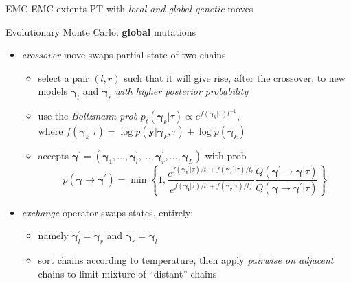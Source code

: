 \documentclass{beamer}
\newcommand{\vect}[1]{\boldsymbol{#1}}
\begin{document}
\begin{frame}{EMC}
EMC extents PT with \emph{local and global genetic} moves
\begin{block}{Evolutionary Monte Carlo: \textbf{global} mutations}
    \begin{itemize}
        \item \emph{crossover} move swaps partial state of two chains
            \begin{itemize}
                \item select a pair $(l, r)$ such that it will give rise, after
                the crossover, to new models $\vect{\gamma}_{l}^{\prime}$
                and $\vect{\gamma}_{r}^{\prime}$ \emph{with higher posterior probability}
                \item use the \emph{Boltzmann prob} $p_{t}(\vect{\gamma}_{k}|\tau) \propto e^{f(\vect{\gamma}_{k}|\tau)t^{-1}}$,\\
                where $f(\vect{\gamma}_{k}|\tau)=\log{p(\vect{y}|\vect{\gamma}_{k},\tau)}+\log{p(\vect{\gamma}_{k})}$
                \item accepts $\vect{\gamma}^{\prime}=(\vect{\gamma}_{1},\ldots,
                \vect{\gamma}_{l}^{\prime},\ldots, \vect{\gamma}_{r}^{\prime},\ldots,
                \vect{\gamma}_{L})$ with prob
                \begin{displaymath}
                    p(\vect{\gamma}\rightarrow\vect{\gamma}^{\prime}) = \min{ \left\lbrace 1,
                    \frac{e^{f(\vect{\gamma_{l}}^{\prime}|\tau)/t_{l}+f(\vect{\gamma_{r}}^{\prime}|\tau)/t_{r}}}
                         {e^{f(\vect{\gamma_{l}}|\tau)/t_{l}+f(\vect{\gamma_{r}}|\tau)/t_{r}}}
                    \frac{Q(\vect{\gamma}^{\prime}\rightarrow\vect{\gamma}|\tau)}
                         {Q(\vect{\gamma}\rightarrow\vect{\gamma}^{\prime}|\tau)}
                    \right\rbrace}
                \end{displaymath}
            \end{itemize}
        \item \emph{exchange} operator swaps states, entirely: 
            \begin{itemize}
                \item namely $\vect{\gamma}_{l}^{\prime} = \vect{\gamma}_{r}$
                and $\vect{\gamma}_{r}^{\prime} = \vect{\gamma}_{l}$
                \item sort chains according to temperature, then apply
                \emph{pairwise on adjacent} chains to limit mixture of ``distant'' chains
            \end{itemize}
    \end{itemize}
\end{block}
\end{frame}
  
\end{document}
